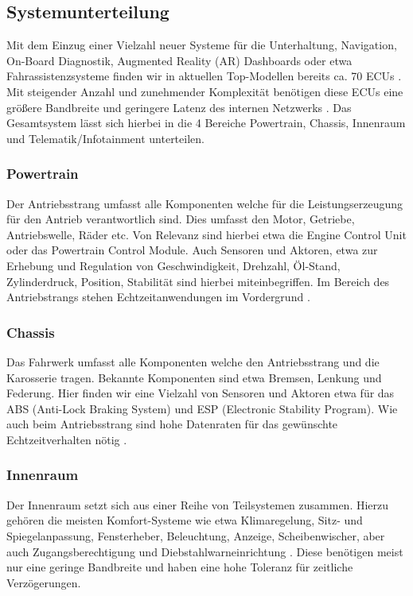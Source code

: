     \subsection{Systemunterteilung}
    Mit dem Einzug einer Vielzahl neuer Systeme für die Unterhaltung, Navigation, On-Board Diagnostik,
    Augmented Reality (AR) Dashboards oder etwa Fahrassistenzsysteme finden wir in aktuellen Top-Modellen bereits 
    ca. 70 ECUs \cite{TW_huang2018vehicle}. Mit steigender Anzahl und zunehmender Komplexität 
    benötigen diese ECUs eine größere Bandbreite und geringere Latenz des internen Netzwerks \cite{TW_huang2018vehicle}.
    Das Gesamtsystem lässt sich hierbei in die 4 Bereiche Powertrain, Chassis, Innenraum und Telematik/Infotainment unterteilen.
        \subsubsection{Powertrain}
        Der Antriebsstrang umfasst alle Komponenten welche für die Leistungserzeugung für den Antrieb verantwortlich sind. Dies umfasst 
        den Motor, Getriebe, Antriebswelle, Räder etc. Von Relevanz sind hierbei etwa die Engine Control Unit oder das Powertrain Control Module.
        Auch Sensoren und Aktoren, etwa zur Erhebung und Regulation von Geschwindigkeit, Drehzahl, Öl-Stand, Zylinderdruck, Position, Stabilität sind hierbei miteinbegriffen.
        Im Bereich des Antriebstrangs stehen Echtzeitanwendungen im Vordergrund \cite{reif2011bosch}\cite{TW_huang2018vehicle}.
        \subsubsection{Chassis}
        Das Fahrwerk umfasst alle Komponenten welche den Antriebsstrang und die Karosserie tragen. Bekannte Komponenten sind etwa
        Bremsen, Lenkung und Federung. Hier finden wir eine Vielzahl von Sensoren und Aktoren etwa für das ABS (Anti-Lock Braking System) und ESP (Electronic Stability Program).
        Wie auch beim Antriebsstrang sind hohe Datenraten für das gewünschte Echtzeitverhalten nötig \cite{TW_huang2018vehicle}.
        \subsubsection{Innenraum}
        Der Innenraum setzt sich aus einer Reihe von Teilsystemen zusammen. Hierzu gehören die meisten Komfort-Systeme wie etwa Klimaregelung, Sitz- und Spiegelanpassung, Fensterheber, Beleuchtung,
        Anzeige, Scheibenwischer, aber auch Zugangsberechtigung und Diebstahlwarneinrichtung \cite{reif2011bosch}. 
        Diese benötigen meist nur eine geringe Bandbreite und haben eine hohe Toleranz für zeitliche Verzögerungen.
